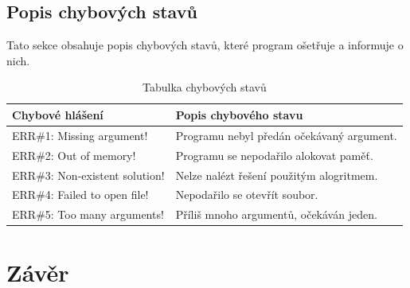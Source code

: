 \documentclass[12pt]{article}
\begin{document}
\subsection{Popis chybových stavů}
Tato sekce obsahuje popis chybových stavů, které program ošetřuje a informuje
o nich.
%
\begin{table}[H]
        \begin{tabular}{|l|p{6.35cm}|}
                \hline
                \bf Chybové hlášení & \bf Popis chybového stavu \\
                \hline
                ERR\#1: Missing argument! & Programu nebyl předán očekávaný
		argument.\\
		\hline
                ERR\#2: Out of memory! & Programu se nepodařilo alokovat
		paměť.\\
                \hline
                ERR\#3: Non-existent solution! & Nelze nalézt řešení použitým
		alogritmem.\\
                \hline
                ERR\#4: Failed to open file! & Nepodařilo se otevřít soubor.\\
                \hline
                ERR\#5: Too many arguments! & Příliš mnoho argumentů, očekáván
		jeden.\\
                \hline
        \end{tabular}
        \caption{Tabulka chybových stavů}
        \label{tab:err}
\end{table}
%
%
\section{Závěr}
\end{document}
